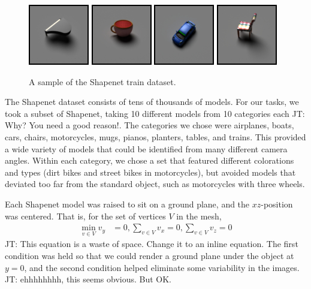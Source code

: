\documentclass[10pt,twocolumn,letterpaper]{article}
\newcommand{\tompson}[1]{{\color{green} JT: #1}}
\begin{document}
\begin{figure}[h!]
\centering
\includegraphics[width=0.24\columnwidth]{./assets/piano.jpg}
\includegraphics[width=0.24\columnwidth]{./assets/mug.jpg}
\includegraphics[width=0.24\columnwidth]{./assets/car.jpg}
\includegraphics[width=0.24\columnwidth]{./assets/chair.jpg}
\caption{A sample of the Shapenet train dataset.}
\label{fig:SHAPENET}
\end{figure}

The Shapenet dataset consists of tens of thousands of models. For our tasks, we took a subset of Shapenet, taking 10 different models from 10 categories each \tompson{Why? You need a good reason!}. The categories we chose were airplanes, boats, cars, chairs, motorcycles, mugs, pianos, planters, tables, and trains. This provided a wide variety of models that could be identified from many different camera angles. Within each category, we chose a set that featured different colorations and types (dirt bikes and street bikes in motorcycles), but avoided models that deviated too far from the standard object, such as motorcycles with three wheels.

Each Shapenet model was raised to sit on a ground plane, and the $xz$-position was centered. That is, for the set of vertices $V$ in the mesh,
\begin{align*}\min_{v\in V}v_y &= 0, \sum_{v\in V} v_x = 0, \sum_{v\in V} v_z = 0
\end{align*}
\tompson{This equation is a waste of space. Change it to an inline equation.}
The first condition was held so that we could render a ground plane under the object at $y=0$, and the second condition helped eliminate some variability in the images. \tompson{ehhhhhhhh, this seems obvious. But OK.}
\end{document}
